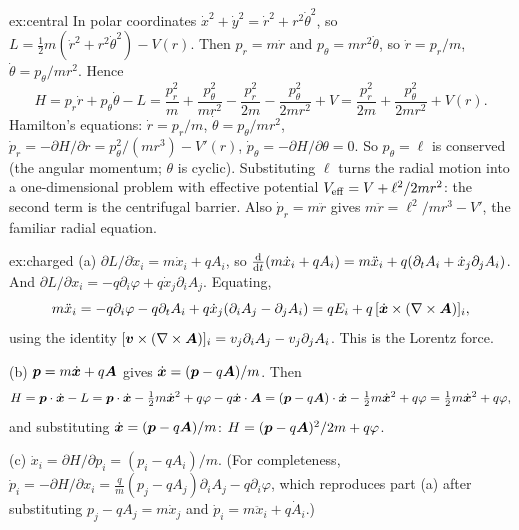 \documentclass[11pt]{article}
\begin{document}
\begin{solution}{ex:central}
In polar coordinates $\dot x^2+\dot y^2=\dot r^2+r^2\dot\theta^2$, so $L=\tfrac12m(\dot r^2+r^2\dot\theta^2)-V(r)$. Then $p_r=m\dot r$ and $p_\theta=mr^2\dot\theta$, so $\dot r=p_r/m$, $\dot\theta=p_\theta/mr^2$. Hence
\[
 H=p_r\dot r+p_\theta\dot\theta-L=\frac{p_r^2}{m}+\frac{p_\theta^2}{mr^2}-\frac{p_r^2}{2m}-\frac{p_\theta^2}{2mr^2}+V
 =\frac{p_r^2}{2m}+\frac{p_\theta^2}{2mr^2}+V(r).
\]
Hamilton's equations: $\dot r=p_r/m$, $\dot\theta=p_\theta/mr^2$, $\dot p_r=-\partial H/\partial r=p_\theta^2/(mr^3)-V'(r)$, $\dot p_\theta=-\partial H/\partial\theta=0$. So $p_\theta=\ell$ is conserved (the angular momentum; $\theta$ is cyclic). Substituting $\ell$ turns the radial motion into a one-dimensional problem with effective potential $V_{\rm eff}=V+\ell^2/2mr^2$: the second term is the centrifugal barrier. Also $\dot p_r=m\ddot r$ gives $m\ddot r=\ell^2/mr^3-V'$, the familiar radial equation.
\end{solution}

\begin{solution}{ex:charged}
(a) $\partial L/\partial\dot x_i=m\dot x_i+qA_i$, so $\frac{\mathrm{d} }{\mathrm{d} t}(m\dot x_i+qA_i)=m\ddot x_i+q(\partial_tA_i+\dot x_j\partial_jA_i)$. And $\partial L/\partial x_i=-q\partial_i\varphi+q\dot x_j\partial_iA_j$. Equating,
\[
 m\ddot x_i=-q\partial_i\varphi-q\partial_tA_i+q\dot x_j(\partial_iA_j-\partial_jA_i)=qE_i+q\,[\dot{\bm{x}}\times(\nabla\times\bm{A})]_i,
\]
using the identity $[\bm{v}\times(\nabla\times\bm{A})]_i=v_j\partial_iA_j-v_j\partial_jA_i$. This is the Lorentz force.

(b) $\bm{p}=m\dot{\bm{x}}+q\bm{A}$ gives $\dot{\bm{x}}=(\bm{p}-q\bm{A})/m$. Then
\[
 H=\bm{p}\cdot\dot{\bm{x}}-L=\bm{p}\cdot\dot{\bm{x}}-\tfrac12m\dot{\bm{x}}^2+q\varphi-q\dot{\bm{x}}\cdot\bm{A}=(\bm{p}-q\bm{A})\cdot\dot{\bm{x}}-\tfrac12m\dot{\bm{x}}^2+q\varphi=\tfrac12m\dot{\bm{x}}^2+q\varphi,
\]
and substituting $\dot{\bm{x}}=(\bm{p}-q\bm{A})/m$: $H=(\bm{p}-q\bm{A})^2/2m+q\varphi$.

(c) $\dot x_i=\partial H/\partial p_i=(p_i-qA_i)/m$. (For completeness, $\dot p_i=-\partial H/\partial x_i=\tfrac qm(p_j-qA_j)\partial_iA_j-q\partial_i\varphi$, which reproduces part (a) after substituting $p_j-qA_j=m\dot x_j$ and $\dot p_i=m\ddot x_i+q\dot A_i$.)
\end{solution}
\end{document}
